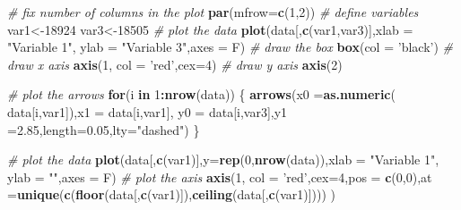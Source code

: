 \documentclass[
]{book}
\newenvironment{Shaded}{\begin{snugshade}}{\end{snugshade}}
\newcommand{\CommentTok}[1]{\textcolor[rgb]{0.56,0.35,0.01}{\textit{#1}}}
\newcommand{\ControlFlowTok}[1]{\textcolor[rgb]{0.13,0.29,0.53}{\textbf{#1}}}
\newcommand{\DataTypeTok}[1]{\textcolor[rgb]{0.13,0.29,0.53}{#1}}
\newcommand{\DecValTok}[1]{\textcolor[rgb]{0.00,0.00,0.81}{#1}}
\newcommand{\FloatTok}[1]{\textcolor[rgb]{0.00,0.00,0.81}{#1}}
\newcommand{\KeywordTok}[1]{\textcolor[rgb]{0.13,0.29,0.53}{\textbf{#1}}}
\newcommand{\NormalTok}[1]{#1}
\newcommand{\OperatorTok}[1]{\textcolor[rgb]{0.81,0.36,0.00}{\textbf{#1}}}
\newcommand{\StringTok}[1]{\textcolor[rgb]{0.31,0.60,0.02}{#1}}
\theoremstyle{definition}
\theoremstyle{definition}
\theoremstyle{definition}
\theoremstyle{remark}
\begin{document}
\begin{Shaded}
\begin{Highlighting}[]
\CommentTok{# fix number of columns in the plot}
\KeywordTok{par}\NormalTok{(}\DataTypeTok{mfrow=}\KeywordTok{c}\NormalTok{(}\DecValTok{1}\NormalTok{,}\DecValTok{2}\NormalTok{))}
\CommentTok{# define variables}
\NormalTok{var1<-}\DecValTok{18924}
\NormalTok{var3<-}\DecValTok{18505}
\CommentTok{# plot the data}
\KeywordTok{plot}\NormalTok{(data[,}\KeywordTok{c}\NormalTok{(var1,var3)],}\DataTypeTok{xlab =} \StringTok{"Variable 1"}\NormalTok{, }\DataTypeTok{ylab =} \StringTok{"Variable 3"}\NormalTok{,}\DataTypeTok{axes =}\NormalTok{ F)}
\CommentTok{# draw the box}
\KeywordTok{box}\NormalTok{(}\DataTypeTok{col =} \StringTok{'black'}\NormalTok{)}
\CommentTok{# draw x axis}
\KeywordTok{axis}\NormalTok{(}\DecValTok{1}\NormalTok{, }\DataTypeTok{col =} \StringTok{'red'}\NormalTok{,}\DataTypeTok{cex=}\DecValTok{4}\NormalTok{)}
\CommentTok{# draw y axis}
\KeywordTok{axis}\NormalTok{(}\DecValTok{2}\NormalTok{)}

\CommentTok{# plot the arrows}
\ControlFlowTok{for}\NormalTok{(i }\ControlFlowTok{in} \DecValTok{1}\OperatorTok{:}\KeywordTok{nrow}\NormalTok{(data))}
\NormalTok{\{}
  \KeywordTok{arrows}\NormalTok{(}\DataTypeTok{x0 =}\KeywordTok{as.numeric}\NormalTok{( data[i,var1]),}\DataTypeTok{x1 =}\NormalTok{  data[i,var1],}
           \DataTypeTok{y0 =}\NormalTok{ data[i,var3],}\DataTypeTok{y1 =}\FloatTok{2.85}\NormalTok{,}\DataTypeTok{length=}\FloatTok{0.05}\NormalTok{,}\DataTypeTok{lty=}\StringTok{"dashed"}\NormalTok{)}
\NormalTok{\}}

\CommentTok{# plot the data}
\KeywordTok{plot}\NormalTok{(data[,}\KeywordTok{c}\NormalTok{(var1)],}\DataTypeTok{y=}\KeywordTok{rep}\NormalTok{(}\DecValTok{0}\NormalTok{,}\KeywordTok{nrow}\NormalTok{(data)),}\DataTypeTok{xlab =} \StringTok{"Variable 1"}\NormalTok{, }\DataTypeTok{ylab =} \StringTok{""}\NormalTok{,}\DataTypeTok{axes =}\NormalTok{ F)}
\CommentTok{# plot the axis}
\KeywordTok{axis}\NormalTok{(}\DecValTok{1}\NormalTok{, }\DataTypeTok{col =} \StringTok{'red'}\NormalTok{,}\DataTypeTok{cex=}\DecValTok{4}\NormalTok{,}\DataTypeTok{pos =} \KeywordTok{c}\NormalTok{(}\DecValTok{0}\NormalTok{,}\DecValTok{0}\NormalTok{),}\DataTypeTok{at =}\KeywordTok{unique}\NormalTok{(}\KeywordTok{c}\NormalTok{(}\KeywordTok{floor}\NormalTok{(data[,}\KeywordTok{c}\NormalTok{(var1)]),}\KeywordTok{ceiling}\NormalTok{(data[,}\KeywordTok{c}\NormalTok{(var1)]))) )}
\end{Highlighting}
\end{Shaded}
\end{document}
